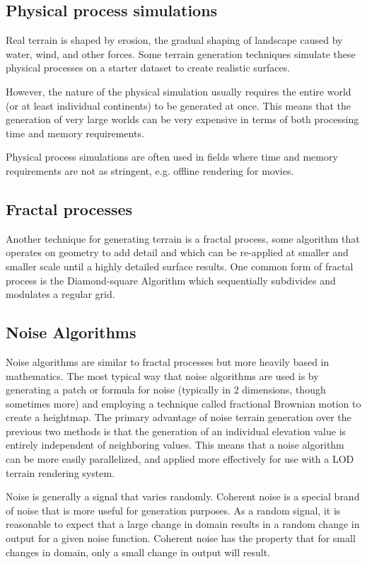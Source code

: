 \subsection{Physical process simulations}

Real terrain is shaped by erosion, the gradual shaping of landscape caused by water, wind, and other forces.
Some terrain generation techniques simulate these physical processes on a starter dataset to create realistic surfaces. \cite{hydrology}

However, the nature of the physical simulation usually requires the entire world (or at least individual continents) to be generated at once.
This means that the generation of very large worlds can be very expensive in terms of both processing time and memory requirements.

Physical process simulations are often used in fields where time and memory requirements are not as stringent, e.g. offline rendering for movies.


\subsection{Fractal processes}

Another technique for generating terrain is a fractal process, some algorithm that operates on geometry to add detail and which can be re-applied at smaller and smaller scale until a highly detailed surface results.
One common form of fractal process is the Diamond-square Algorithm which sequentially subdivides and modulates a regular grid.


\subsection{Noise Algorithms}

Noise algorithms are similar to fractal processes but more heavily based in mathematics.
The most typical way that noise algorithms are used is by generating a patch or formula for noise (typically in 2 dimensions, though sometimes more) and employing a technique called fractional Brownian motion to create a heightmap.
The primary advantage of noise terrain generation over the previous two methods is that the generation of an individual elevation value is entirely independent of neighboring values.
This means that a noise algorithm can be more easily parallelized, and applied more effectively for use with a LOD terrain rendering system.

Noise is generally a signal that varies randomly.
Coherent noise is a special brand of noise that is more useful for generation purposes.
As a random signal, it is reasonable to expect that a large change in domain results in a random change in output for a given noise function.
Coherent noise has the property that for small changes in domain, only a small change in output will result.




